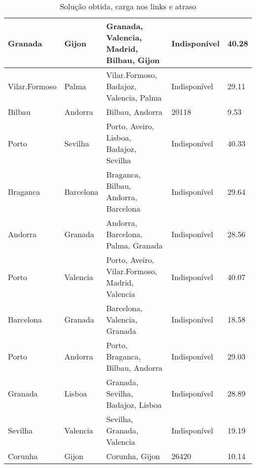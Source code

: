 \begin{table}[!htb]
{\begin{tabular}{|l|l|l|l|l|}
Granada & Gijon & Granada, Valencia, Madrid, Bilbau, Gijon & Indisponível & 40.28 \\ \hline
Vilar.Formoso & Palma & Vilar.Formoso, Badajoz, Valencia, Palma & Indisponível & 29.11 \\ \hline
Bilbau & Andorra & Bilbau, Andorra & 20118 & 9.53 \\ \hline
Porto & Sevilha & Porto, Aveiro, Lisboa, Badajoz, Sevilha & Indisponível & 40.33 \\ \hline
Braganca & Barcelona & Braganca, Bilbau, Andorra, Barcelona & Indisponível & 29.64 \\ \hline
Andorra & Granada & Andorra, Barcelona, Palma, Granada & Indisponível & 28.56 \\ \hline
Porto & Valencia & Porto, Aveiro, Vilar.Formoso, Madrid, Valencia & Indisponível & 40.07 \\ \hline
Barcelona & Granada & Barcelona, Valencia, Granada & Indisponível & 18.58 \\ \hline
Porto & Andorra & Porto, Braganca, Bilbau, Andorra & Indisponível & 29.03 \\ \hline
Granada & Lisboa & Granada, Sevilha, Badajoz, Lisboa & Indisponível & 28.89 \\ \hline
Sevilha & Valencia & Sevilha, Granada, Valencia & Indisponível & 19.19 \\ \hline
Corunha & Gijon & Corunha, Gijon & 26420 & 10.14 \\ \hline
\end{tabular}}
\caption[]{Solução obtida, carga nos links e atraso}
\end{table}

\begin{table}[!htb]
        \centering
\caption[]{Solução obtida, carga nos links e atraso}
\end{table}

